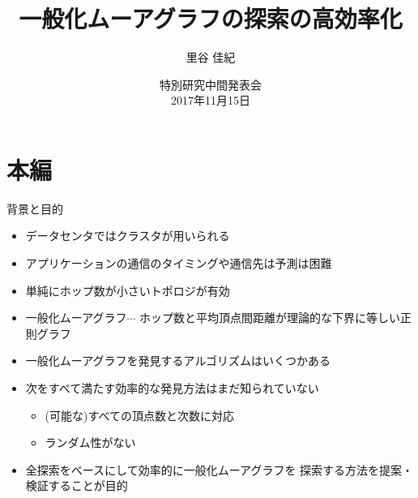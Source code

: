 \documentclass[dvipdfmx]{beamer}
\title{一般化ムーアグラフの探索の高効率化}
\author{里谷 佳紀}
\institute{高橋研究室}
\date[特別研究中間発表会]{特別研究中間発表会 \\ 2017年11月15日}
\theoremstyle{definition}
\begin{document}
\begin{frame}
  \maketitle
\end{frame}

\section{本編}
\begin{frame}{背景と目的}
  \begin{itemize}
  \item データセンタではクラスタが用いられる
  \item アプリケーションの通信のタイミングや通信先は予測は困難
  \item 単純にホップ数が小さいトポロジが有効\cite{Koibuchi2012, Singla2011}
  \item \alert{一般化ムーアグラフ}$\cdots$
    ホップ数と平均頂点間距離が理論的な下界に等しい正則グラフ
    \cite{cerf1973computer, Cerf1974}
  \item 一般化ムーアグラフを発見するアルゴリズムはいくつかある
    \cite{Sampels2004, Fujita2015, Yamamoto2016}
  \item 次をすべて満たす効率的な発見方法はまだ知られていない
    \begin{itemize}
    \item (可能な)すべての頂点数と次数に対応
    \item ランダム性がない
    \end{itemize}
  \item 全探索をベースにして効率的に一般化ムーアグラフを
    探索する方法を提案・検証することが目的
  \end{itemize}
\end{frame}
\end{document}
